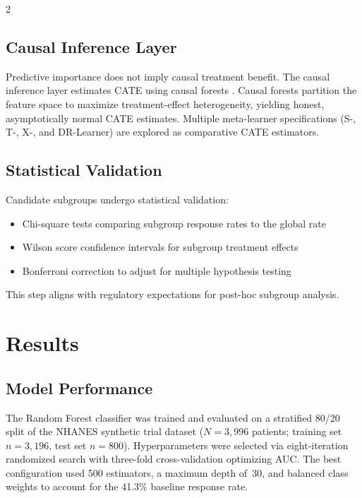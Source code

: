 \documentclass[12pt]{article}
\begin{document}
\begin{multicols}{2}

\subsection{Causal Inference Layer}

Predictive importance does not imply causal treatment benefit.  The causal
inference layer estimates CATE using causal forests \citep{wager2018estimation}.
Causal forests partition the feature space to maximize treatment-effect
heterogeneity, yielding honest, asymptotically normal CATE estimates.
Multiple meta-learner specifications (S-, T-, X-, and DR-Learner)
\citep{kunzel2019metalearners} are explored as comparative CATE estimators.

\subsection{Statistical Validation}

Candidate subgroups undergo statistical validation:
\begin{itemize}
\item Chi-square tests comparing subgroup response rates to the global rate
\item Wilson score confidence intervals for subgroup treatment effects
\item Bonferroni correction to adjust for multiple hypothesis testing
\end{itemize}
This step aligns with regulatory expectations for post-hoc subgroup analysis.

\section{Results}

\subsection{Model Performance}

The Random Forest classifier was trained and evaluated on a stratified
80/20 split of the NHANES synthetic trial dataset ($N = 3{,}996$ patients;
training set $n = 3{,}196$, test set $n = 800$).  Hyperparameters were
selected via eight-iteration randomized search with three-fold cross-validation
optimizing AUC.  The best configuration used 500 estimators, a maximum depth
of~30, and balanced class weights to account for the 41.3\% baseline response
rate.


\end{multicols}
\end{document}
